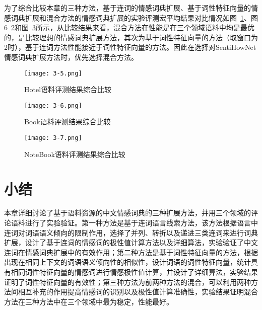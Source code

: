 为了综合比较本章的三种方法，基于连词的情感词典扩展、基于词性特征向量的情感词典扩展和混合方法的情感词典扩展的实验评测宏平均结果对比情况如图~\ref{fig3-5}、图6~\ref{fig3-6}和图~\ref{fig3-7}所示，从比较结果来看，混合方法在性能是在三个领域语料中均是最优的，是比较理想的情感词典扩展方法，其次为基于词性特征向量的方法（取窗口为2时），基于连词方法性能接近于词性特征向量的方法。因此在选择对SentiHowNet情感词典扩展方法时，优先选择混合方法。

\begin{figure}[htp]
\centering
\texttt{[image: 3-5.png]}
\caption{Hotel语料评测结果综合比较}
\label{fig3-5}
\end{figure}

\begin{figure}[htp]
\centering
\texttt{[image: 3-6.png]}
\caption{Book语料评测结果综合比较}
\label{fig3-6}
\end{figure}

\begin{figure}[htp]
\centering
\texttt{[image: 3-7.png]}
\caption{NoteBook语料评测结果综合比较}
\label{fig3-7}
\end{figure}

\section{小结}
本章详细讨论了基于语料资源的中文情感词典的三种扩展方法，并用三个领域的评论语料进行了实验验证。第一种方法是基于连词语言线索方法，该方法根据语言中连词对词语语义倾向的限制作用，选择了并列、转折以及递进三类连词来进行词典扩展，设计了基于连词的情感词的极性值计算方法以及详细算法，实验验证了中文连词在情感词典扩展中的有效作用；第二种方法是基于词性特征向量的方法，根据出现在相同上下文的词语语义倾向性的相似性，设计词语的词性特征向量，统计具有相同词性特征向量的情感词进行情感极性值计算，并设计了详细算法，实验结果证明了词性特征向量的有效性；第三种方法为前两种方法的混合，可以利用两种方法间相互补充的作用提高情感词的识别以及极性值计算准确性，实验结果证明混合方法在三种方法中在三个领域中最为稳定，性能最好。

